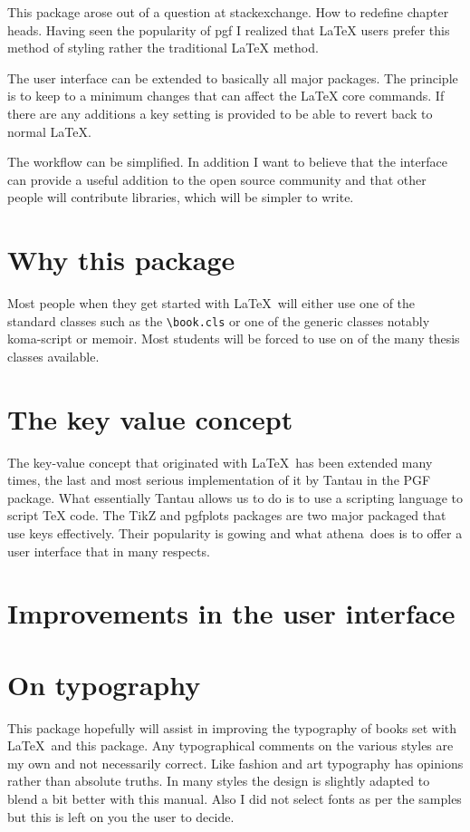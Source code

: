 \documentclass[10pt]{book}
\def\file#1{\protect\texttt{\textbackslash #1}}
\def\athena{\textcolor{thered}{athena}}
\begin{document}
{This package arose out of a question at stackexchange. How to redefine chapter heads. Having seen the popularity of pgf I realized that LaTeX users prefer this method of styling rather the traditional LaTeX method. 

The user interface can be extended to basically all major packages. The principle is to keep to a minimum changes that can affect the LaTeX core commands. If there are any additions a key setting is provided to be able to revert back to normal LaTeX.

The workflow can be simplified. In addition I want to believe that the interface can provide a useful addition to the open source community and that other people will contribute libraries, which will be simpler to write.

\section{Why this package}

Most people when they get started with \LaTeX\ will either use one of the standard classes such as the \file{book.cls} or one of the generic classes notably koma-script or memoir. Most students will be forced to use on of the many thesis classes available. 

\section{The key value concept}

The key-value concept that originated with \LaTeX\ has been extended many times, the last and most serious implementation of it by Tantau in the PGF package. What essentially Tantau allows us to do is to use a scripting language to script TeX code. The TikZ and pgfplots packages are two major packaged that use keys effectively. Their popularity is gowing and what \athena\ does is to offer a user interface that in many respects.



\section{Improvements in the user interface}

\section{On typography}

This package hopefully will assist in improving the typography of books set with \LaTeX\ and this package. Any typographical comments on the various styles are my own and not necessarily correct. Like fashion and art typography has opinions rather than absolute truths. In many styles the design is slightly adapted to blend a bit better with this manual. Also I did not select fonts as per the samples but this is left on you the user to decide.

}
\end{document}
